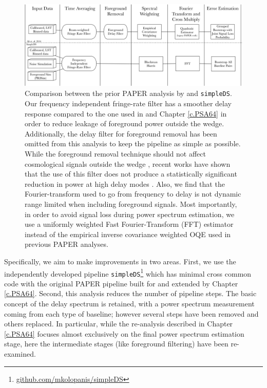 \begin{figure}[tp]
\begin{center}
\includegraphics[width=\textwidth]{plots/simpleDS_pipeline_compare.jpg}
\caption{Comparison between the prior PAPER analysis by \citet{ali_et_al2015} and \texttt{simpleDS}.
Our frequency independent fringe-rate filter has a smoother
delay response compared to the one used in
\citet{ali_et_al2015} and
Chapter \ref{c.PSA64} in order to reduce leakage
of foreground power outside the wedge.
Additionally, the delay filter for foreground removal has been
omitted from this analysis to keep the pipeline
as simple as possible. While the foreground removal
technique should not affect cosmological
signals outside the wedge
\citep{parsons_backer2009, parsons_et_al2012b, parsons_et_al2014},
recent works have shown that the use of this filter does
not produce a statistically significant reduction
in power at high delay modes \citep{kerrigan_et_al2018}.
Also, we find that the Fourier-transform used to go from
frequency to delay is not dynamic range limited
when including foreground signals.
Most importantly, in order to avoid signal loss during power spectrum
estimation, we use a uniformly weighted
Fast Fourier-Transform (FFT) estimator instead of the
empirical inverse covariance weighted OQE used in
previous PAPER analyses.}
\label{fig:pipeline_compare}
\end{center}
\end{figure}

Specifically, we aim to make improvements in two areas. First, we use the
independently developed pipeline \texttt{simpleDS}\footnote{\url{github.com/mkolopanis/simpleDS}} which has minimal cross common code with the original PAPER pipeline built for  and
extended by Chapter \ref{c.PSA64}.
 Second, this analysis reduces the number of pipeline steps.  The basic concept of the delay spectrum
is retained, with a power spectrum measurement coming from each type of baseline; however several steps have been removed and others replaced. In particular, while the re-analysis described in Chapter \ref{c.PSA64} focuses almost exclusively on
the final power spectrum estimation stage, here the intermediate stages (like foreground filtering) have been re-examined.

